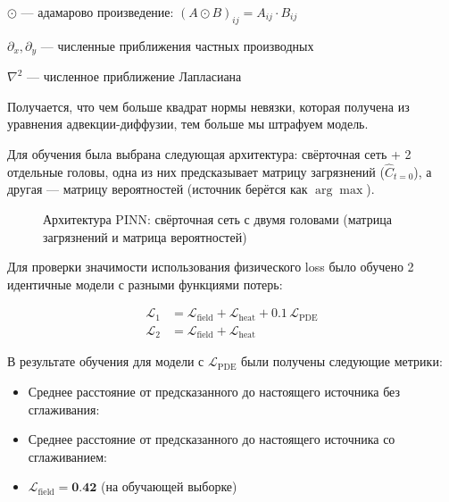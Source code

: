 \documentclass[12pt]{article}
\begin{document}
$\odot$ --- адамарово произведение: $(A \odot B)_{ij} = A_{ij} \cdot B_{ij}$

$\partial_x, \partial_y$ --- численные приближения частных производных

$\nabla^2$ --- численное приближение Лапласиана

Получается, что чем больше квадрат нормы невязки, которая получена из уравнения адвекции-диффузии, тем больше мы штрафуем модель.

Для обучения была выбрана следующая архитектура: свёрточная сеть + 2 отдельные головы, одна из них предсказывает матрицу загрязнений ($\hat{C}_{t=0}$), а другая --- матрицу вероятностей (источник берётся как $\arg\max$).

\begin{figure}[h]
    \centering
    \caption{Архитектура PINN: свёрточная сеть с двумя головами (матрица загрязнений и матрица вероятностей)}
    \label{fig:pinn_arch}
\end{figure}

Для проверки значимости использования физического loss было обучено 2 идентичные модели с разными функциями потерь:

$$
\begin{aligned}
    \mathcal{L}_1 &= \mathcal{L}_{\text{field}} + \mathcal{L}_{\text{heat}} + 0.1\,\mathcal{L}_{\text{PDE}}\\
    \mathcal{L}_2 &= \mathcal{L}_{\text{field}} + \mathcal{L}_{\text{heat}}
\end{aligned}
$$

В результате обучения для модели с $\mathcal{L}_{\text{PDE}}$ были получены следующие метрики:

\begin{itemize}
    \item Среднее расстояние от предсказанного до настоящего источника без сглаживания: \textbf{\mPinnMean}
    \item Среднее расстояние от предсказанного до настоящего источника со сглаживанием: \textbf{\mPinnSmooth}
    \item $\mathcal{L}_{\text{field}} = \textbf{0.42}$ (на обучающей выборке)
\end{itemize}
\end{document}
